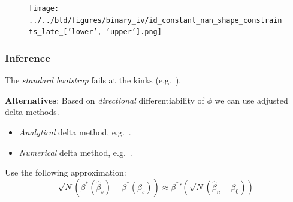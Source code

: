 \documentclass[11pt, aspectratio=169]{beamer}
\begin{document}
\begin{frame}
    \begin{figure}
        \texttt{[image: ../../bld/figures/binary\_iv/id\_constant\_nan\_shape\_constraints\_late\_['lower', 'upper'].png]}
    \end{figure}
\end{frame}

\begin{frame}[label=infsimple]
    \frametitle{Inference}

    The \textit{standard bootstrap} fails at the kinks (e.g.~\citet{fang2019infdirdiff}).

    \vspace{0.5cm}

    \textbf{Alternatives}: Based on \textit{directional} differentiability of $\phi$ we can use adjusted delta methods.
    \begin{itemize}
        \item \textit{Analytical} delta method, e.g.~\cite{fang2019infdirdiff}.
        \item \textit{Numerical} delta method, e.g.~\cite{hong2018numerical}.
    \end{itemize}

    \vspace{0.5cm}
    Use the following approximation:
    \begin{equation*}
        \sqrt{N}\left({\overline{\beta^*}(\hat{\beta}_s)} - \overline{\beta^*}(\beta_s)\right) \approx \overline{\beta^*}'\left(\sqrt{N}\left(\hat{\beta}_n - \beta_0\right)\right)
    \end{equation*}

    \footnotesize  \hyperlink{analytical_delta}{}

\end{frame}
\end{document}
